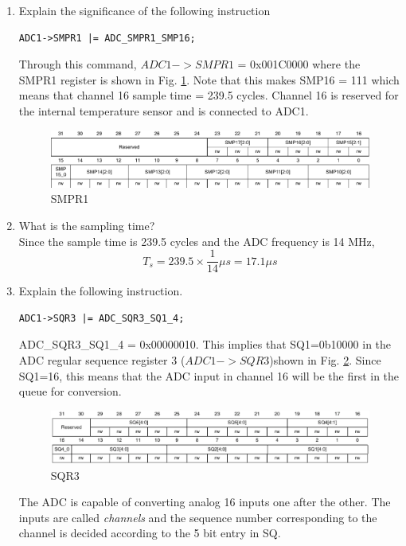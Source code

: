 \documentclass[journal,12pt,twocolumn]{IEEEtran}
\renewcommand\thesection{\arabic{section}}
\renewcommand\thesubsection{\thesection.\arabic{subsection}}
\begin{document}
\begin{enumerate}[label=\thesubsection.\arabic*.,ref=\thesubsection.\theenumi]
\item Explain the significance of the following instruction
\begin{lstlisting}
ADC1->SMPR1 |= ADC_SMPR1_SMP16;
\end{lstlisting}
\solution Through this command, $ADC1->SMPR1$ = 0x001C0000 where the SMPR1 register is shown in Fig. \ref{fig:smpr1}.  Note that
this makes SMP16 = 111 which means that channel 16 sample time = 239.5 cycles.  Channel 16 is reserved for the internal temperature 
sensor and is connected to ADC1.
%
\begin{figure}
\centering
\includegraphics[width=\columnwidth]{./stm32/adc/figs/smpr1.eps}
\caption{SMPR1}
\label{fig:smpr1}
\end{figure}
%
\item What is the sampling time?
\\
\solution Since the sample time is 239.5 cycles and the ADC frequency is 14 MHz, 
\begin{equation}
T_{s} = 239.5 \times \frac{1}{14} \mu s = 17.1 \mu s 
\end{equation}
\item Explain the following instruction.
\begin{lstlisting}
ADC1->SQR3 |= ADC_SQR3_SQ1_4;
\end{lstlisting}

\solution ADC\_SQR3\_SQ1\_4 = 0x00000010.  This implies that SQ1=0b10000 in
the ADC regular sequence register 3 ($ADC1->SQR3$)shown in Fig. \ref{fig:sqr3}. Since SQ1=16,
this means that the ADC input in channel 16 will be the first in the queue
for conversion. 
%
\begin{figure}
\centering
\includegraphics[width=\columnwidth]{./stm32/adc/figs/sqr3.eps}
\caption{SQR3}
\label{fig:sqr3}
\end{figure}
%
The ADC is capable of converting analog 16 inputs one after the other. 
The inputs are called {\em channels} and the sequence number corresponding 
to the channel
is decided
according to the 5 bit entry in SQ. 

\end{enumerate}
\end{document}
